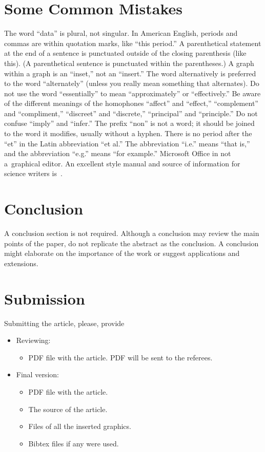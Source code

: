 \documentclass[conference]{IEEEtran}
\begin{document}
\section{Some Common Mistakes}
The word ``data'' is plural, not singular.  In American English, periods and commas are within quotation marks, like ``this period.''  A parenthetical statement at the end of a sentence is punctuated outside of the closing parenthesis (like this).  (A parenthetical sentence is punctuated within the parentheses.)  A graph within a graph is an ``inset,'' not an ``insert.''  The word alternatively is preferred to the word ``alternately'' (unless you really mean something that alternates).  Do not use the word ``essentially'' to mean ``approximately'' or ``effectively.''  Be aware of the different meanings of the homophones ``affect'' and ``effect,'' ``complement'' and ``compliment,'' ``discreet'' and ``discrete,'' ``principal'' and ``principle.''  Do not confuse ``imply'' and ``infer.''  The prefix ``non'' is not a word; it should be joined to the word it modifies, usually without a hyphen.  There is no period after the ``et'' in the Latin abbreviation ``et al.''  The abbreviation ``i.e.'' means ``that is,'' 
and the abbreviation ``e.g.'' means ``for example.'' Microsoft Office in not a~graphical editor. An excellent style manual and source of information for science writers is~\cite{c7}.

\section{Conclusion}
A conclusion section is not required. Although a conclusion may review the main points of the paper, do not replicate the abstract as the conclusion. A conclusion might elaborate on the importance of the work or suggest applications and extensions. 

\section{Submission}
Submitting the article, please, provide
\begin{itemize}
\item Reviewing:
\begin{itemize}
\item PDF file with the article. PDF will be sent to the referees.
\end{itemize}
\item Final version:
\begin{itemize}
\item PDF file with the article.
\item The source of the article.
\item Files of all the inserted graphics.
\item Bibtex files if any were used.
\end{itemize}
\end{itemize}
\end{document}
